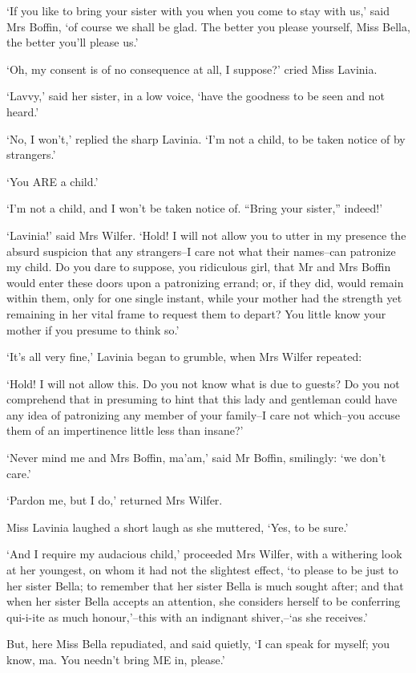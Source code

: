‘If you like to bring your sister with you when you come to stay with
us,’ said Mrs Boffin, ‘of course we shall be glad. The better you please
yourself, Miss Bella, the better you’ll please us.’

‘Oh, my consent is of no consequence at all, I suppose?’ cried Miss
Lavinia.

‘Lavvy,’ said her sister, in a low voice, ‘have the goodness to be seen
and not heard.’

‘No, I won’t,’ replied the sharp Lavinia. ‘I’m not a child, to be taken
notice of by strangers.’

‘You ARE a child.’

‘I’m not a child, and I won’t be taken notice of. “Bring your sister,”
 indeed!’

‘Lavinia!’ said Mrs Wilfer. ‘Hold! I will not allow you to utter in my
presence the absurd suspicion that any strangers--I care not what their
names--can patronize my child. Do you dare to suppose, you ridiculous
girl, that Mr and Mrs Boffin would enter these doors upon a patronizing
errand; or, if they did, would remain within them, only for one single
instant, while your mother had the strength yet remaining in her vital
frame to request them to depart? You little know your mother if you
presume to think so.’

‘It’s all very fine,’ Lavinia began to grumble, when Mrs Wilfer
repeated:

‘Hold! I will not allow this. Do you not know what is due to guests?
Do you not comprehend that in presuming to hint that this lady and
gentleman could have any idea of patronizing any member of your
family--I care not which--you accuse them of an impertinence little less
than insane?’

‘Never mind me and Mrs Boffin, ma’am,’ said Mr Boffin, smilingly: ‘we
don’t care.’

‘Pardon me, but I do,’ returned Mrs Wilfer.

Miss Lavinia laughed a short laugh as she muttered, ‘Yes, to be sure.’

‘And I require my audacious child,’ proceeded Mrs Wilfer, with a
withering look at her youngest, on whom it had not the slightest effect,
‘to please to be just to her sister Bella; to remember that her sister
Bella is much sought after; and that when her sister Bella accepts an
attention, she considers herself to be conferring qui-i-ite as much
honour,’--this with an indignant shiver,--‘as she receives.’

But, here Miss Bella repudiated, and said quietly, ‘I can speak for
myself; you know, ma. You needn’t bring ME in, please.’

